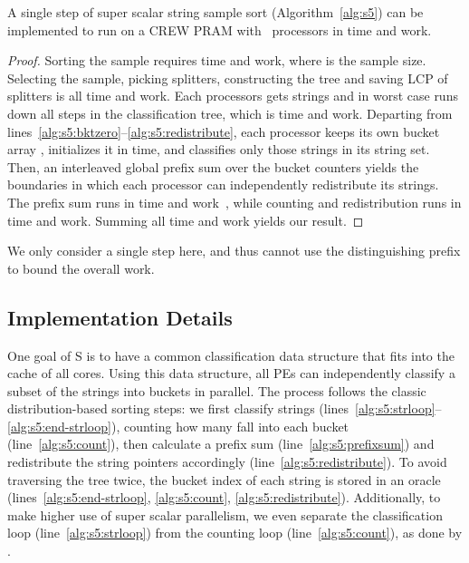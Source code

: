 \documentclass[a4paper]{myjournal}
\begin{document}
\begin{theorem}
  A single step of super scalar string sample sort (Algorithm~\ref{alg:s5}) can
  be implemented to run on a CREW PRAM with ~processors in  time and  work.
\end{theorem}
\begin{proof}
  Sorting the sample requires  time and
   work, where  is the
  sample size. Selecting the sample, picking splitters, constructing the tree
  and saving LCP of splitters is all  time and 
  work. Each processors gets  strings and in worst case runs down
  all  steps in the classification tree, which is  time and  work. Departing from
  lines~\ref{alg:s5:bktzero}--\ref{alg:s5:redistribute}, each processor keeps
  its own bucket array , initializes it in  time, and classifies
  only those strings in its string set. Then, an interleaved global prefix sum
  over the  bucket counters yields the boundaries in which each
  processor can independently redistribute its strings. The prefix sum runs in
   time and  work~\cite{kogge1973parallel}, while
  counting and redistribution runs in  time and 
  work. Summing all time and work yields our result.
\end{proof}

We only consider a single step here, and thus cannot use the distinguishing
prefix  to bound the overall work.

\subsection{Implementation Details}

One goal of S is to have a common classification data structure that fits
into the cache of all cores. Using this data structure, all PEs can
independently classify a subset of the strings into buckets in parallel.  The
process follows the classic distribution-based sorting steps: we first classify
strings (lines~\ref{alg:s5:strloop}--\ref{alg:s5:end-strloop}), counting how
many fall into each bucket (line~\ref{alg:s5:count}), then calculate a prefix
sum (line~\ref{alg:s5:prefixsum}) and redistribute the string pointers
accordingly (line~\ref{alg:s5:redistribute}). To avoid traversing the tree
twice, the bucket index of each string is stored in an oracle
(lines~\ref{alg:s5:end-strloop}, \ref{alg:s5:count},
\ref{alg:s5:redistribute}). Additionally, to make higher use of super scalar
parallelism, we even separate the classification loop
(line~\ref{alg:s5:strloop}) from the counting loop (line~\ref{alg:s5:count}), as
done by \cite{karkkainen2009engineering}.
\end{document}
